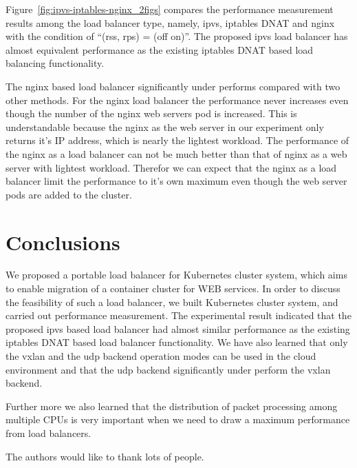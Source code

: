 Figure~\ref{fig:ipvs-iptables-nginx_2figs} compares the performance measurement results 
among the load balancer type, namely, ipvs, iptables DNAT and nginx 
with the condition of \enquote{(rss, rps) = (off on)}.
The proposed ipvs load balancer has almost equivalent performance as the existing iptables 
DNAT based load balancing functionality. 

The nginx based load balancer significantly under performs compared with two other methods.
For the nginx load balancer the performance never increases even though the number of the 
nginx web servers pod is increased.
This is understandable because the nginx as the web server in our experiment only 
returns it's IP address, which is nearly the lightest workload.
The performance of the nginx as a load balancer can not be much better than that of nginx as a web server 
with lightest workload.
Therefor we can expect that the nginx as a load balancer limit the performance to it's own maximum 
even though the web server pods are added to the cluster.

\section{Conclusions}\label{Conclusions}

We proposed a portable load balancer for Kubernetes cluster system, 
which aims to enable migration of a container cluster for WEB services.
In order to discuss the feasibility of such a load balancer, we built 
Kubernetes cluster system, and carried out performance measurement.
The experimental result indicated that the proposed ipvs based load balancer
had almost similar performance as the existing iptables DNAT based load balancer functionality.
We have also learned that only the vxlan and the udp backend operation modes can be used 
in the cloud environment and that the udp backend significantly under perform the vxlan backend.

Further more we also learned that the distribution of packet processing among multiple CPUs is very important
when we need to draw a maximum performance from load balancers.




\begin{acks}
  The authors would like to thank lots of people.

\end{acks}
